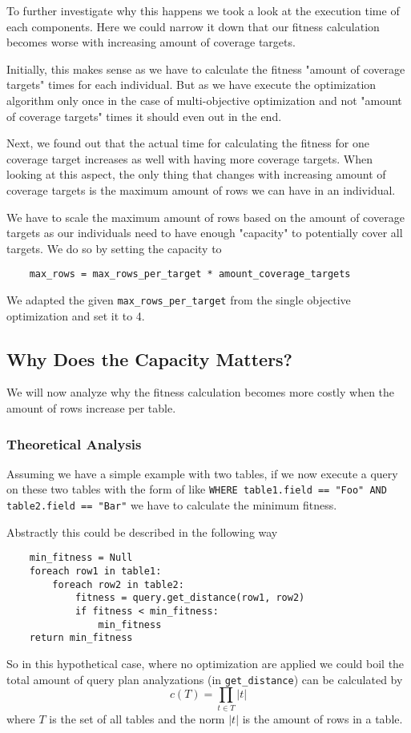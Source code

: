 To further investigate why this happens we took a look at the execution time of each components. Here we could narrow it down that our fitness calculation becomes worse with increasing amount of coverage targets.

Initially, this makes sense as we have to calculate the fitness "amount of coverage targets" times for each individual. But as we have execute the optimization algorithm only once in the case of multi-objective optimization and not "amount of coverage targets" times it should even out in the end.

Next, we found out that the actual time for calculating the fitness for one coverage target increases as well with having more coverage targets. When looking at this aspect, the only thing that changes with increasing amount of coverage targets is the maximum amount of rows we can have in an individual.

We have to scale the maximum amount of rows based on the amount of coverage targets as our individuals need to have enough "capacity" to potentially cover all targets. We do so by setting the capacity to
\begin{verbatim}
	max_rows = max_rows_per_target * amount_coverage_targets
\end{verbatim}
We adapted the given \verb|max_rows_per_target| from the single objective optimization and set it to 4.

\subsection{Why Does the Capacity Matters?}
\label{sec:why_capacity_matters}
We will now analyze why the fitness calculation becomes more costly when the amount of rows increase per table.

\subsubsection{Theoretical Analysis}

Assuming we have a simple example with two tables, if we now execute a query on these two tables with the form of like \verb|WHERE table1.field == "Foo" AND table2.field == "Bar"| we have to calculate the minimum fitness.

Abstractly this could be described in the following way
\begin{verbatim}
    min_fitness = Null
    foreach row1 in table1:
        foreach row2 in table2:
            fitness = query.get_distance(row1, row2)
            if fitness < min_fitness:
                min_fitness
    return min_fitness
\end{verbatim}
So in this hypothetical case, where no optimization are applied we could boil the total amount of query plan analyzations (in \verb|get_distance|) can be calculated by
\begin{equation}
	\label{eqn:comparisons_for_fitness}
	c(T) = \prod_{t \in T} |t|
\end{equation}
where $T$ is the set of all tables and the norm $|t|$ is the amount of rows in a table.

